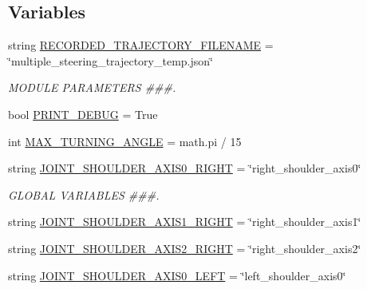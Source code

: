 \subsection*{Variables}
\begin{DoxyCompactItemize}
\item 
string \mbox{\hyperlink{namespaceinterpolate__multiple__steering_aa3c71c4ce3637fe461a24a3e7fd32805}{R\+E\+C\+O\+R\+D\+E\+D\+\_\+\+T\+R\+A\+J\+E\+C\+T\+O\+R\+Y\+\_\+\+F\+I\+L\+E\+N\+A\+ME}} = \char`\"{}multiple\+\_\+steering\+\_\+trajectory\+\_\+temp.\+json\char`\"{}
\begin{DoxyCompactList}\small\item\em M\+O\+D\+U\+LE P\+A\+R\+A\+M\+E\+T\+E\+RS \#\#\#. \end{DoxyCompactList}\item 
bool \mbox{\hyperlink{namespaceinterpolate__multiple__steering_a6844a3fd6c6dc5d284e1a5fb37e64d66}{P\+R\+I\+N\+T\+\_\+\+D\+E\+B\+UG}} = True
\item 
int \mbox{\hyperlink{namespaceinterpolate__multiple__steering_a7e8c205cd19822386ddb92c85729c222}{M\+A\+X\+\_\+\+T\+U\+R\+N\+I\+N\+G\+\_\+\+A\+N\+G\+LE}} = math.\+pi / 15
\item 
string \mbox{\hyperlink{namespaceinterpolate__multiple__steering_af3ef392ac43caa2668968f2d196d4998}{J\+O\+I\+N\+T\+\_\+\+S\+H\+O\+U\+L\+D\+E\+R\+\_\+\+A\+X\+I\+S0\+\_\+\+R\+I\+G\+HT}} = \char`\"{}right\+\_\+shoulder\+\_\+axis0\char`\"{}
\begin{DoxyCompactList}\small\item\em G\+L\+O\+B\+AL V\+A\+R\+I\+A\+B\+L\+ES \#\#\#. \end{DoxyCompactList}\item 
string \mbox{\hyperlink{namespaceinterpolate__multiple__steering_ab65ff4f85b140d38e1279b47c272f46b}{J\+O\+I\+N\+T\+\_\+\+S\+H\+O\+U\+L\+D\+E\+R\+\_\+\+A\+X\+I\+S1\+\_\+\+R\+I\+G\+HT}} = \char`\"{}right\+\_\+shoulder\+\_\+axis1\char`\"{}
\item 
string \mbox{\hyperlink{namespaceinterpolate__multiple__steering_a109aadbc1f641efca74cf6b209c83d1c}{J\+O\+I\+N\+T\+\_\+\+S\+H\+O\+U\+L\+D\+E\+R\+\_\+\+A\+X\+I\+S2\+\_\+\+R\+I\+G\+HT}} = \char`\"{}right\+\_\+shoulder\+\_\+axis2\char`\"{}
\item 
string \mbox{\hyperlink{namespaceinterpolate__multiple__steering_a1ff5a4c59f03c93d4a4cbac9605e91b3}{J\+O\+I\+N\+T\+\_\+\+S\+H\+O\+U\+L\+D\+E\+R\+\_\+\+A\+X\+I\+S0\+\_\+\+L\+E\+FT}} = \char`\"{}left\+\_\+shoulder\+\_\+axis0\char`\"{}
\item 

\end{DoxyCompactItemize}

